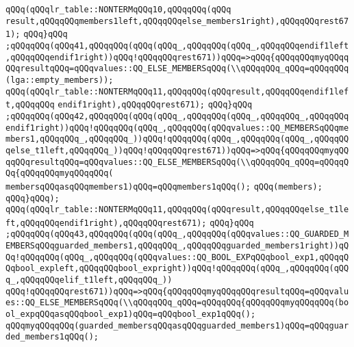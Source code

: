 \verb|qQQq(qQQqlr_table::NONTERMqQQq10,qQQqqQQq(qQQq|\newline
\verb|result,qQQqqQQqmembers1left,qQQqqQQqelse_members1right),qQQqqQQqrest671);|\newline
\verb|qQQq}qQQq|\newline
\verb|;qQQqqQQq(qQQq41,qQQqqQQq(qQQq(qQQq_,qQQqqQQq(qQQq_,qQQqqQQqendif1left,qQQqqQQqendif1right))qQQq!qQQqqQQqrest671))qQQq=>qQQq{qQQqqQQqmyqQQqqQQqresultqQQq=qQQqvalues::QQ_ELSE_MEMBERSqQQq(\\qQQqqQQq_qQQq=qQQqqQQq(lga::empty_members));|\newline
\verb|qQQq(qQQqlr_table::NONTERMqQQq11,qQQqqQQq(qQQqresult,qQQqqQQqendif1left,qQQqqQQq|\newline
\verb|endif1right),qQQqqQQqrest671);|\newline
\verb|qQQq}qQQq|\newline
\verb|;qQQqqQQq(qQQq42,qQQqqQQq(qQQq(qQQq_,qQQqqQQq(qQQq_,qQQqqQQq_,qQQqqQQqendif1right))qQQq!qQQqqQQq(qQQq_,qQQqqQQq(qQQqvalues::QQ_MEMBERSqQQqmembers1,qQQqqQQq_,qQQqqQQq_))qQQq!qQQqqQQq(qQQq_,qQQqqQQq(qQQq_,qQQqqQQqelse_t1left,qQQqqQQq_))qQQq!qQQqqQQqrest671))qQQq=>qQQq{qQQqqQQqmyqQQqqQQqresultqQQq=qQQqvalues::QQ_ELSE_MEMBERSqQQq(\\qQQqqQQq_qQQq=qQQqqQQq{qQQqqQQqmyqQQqqQQq(|\newline
\verb|membersqQQqasqQQqmembers1)qQQq=qQQqmembers1qQQq();|\newline
\verb|qQQq(members);|\newline
\verb|qQQq}qQQq);|\newline
\verb|qQQq(qQQqlr_table::NONTERMqQQq11,qQQqqQQq(qQQqresult,qQQqqQQqelse_t1left,qQQqqQQqendif1right),qQQqqQQqrest671);|\newline
\verb|qQQq}qQQq|\newline
\verb|;qQQqqQQq(qQQq43,qQQqqQQq(qQQq(qQQq_,qQQqqQQq(qQQqvalues::QQ_GUARDED_MEMBERSqQQqguarded_members1,qQQqqQQq_,qQQqqQQqguarded_members1right))qQQq!qQQqqQQq(qQQq_,qQQqqQQq(qQQqvalues::QQ_BOOL_EXPqQQqbool_exp1,qQQqqQQqbool_expleft,qQQqqQQqbool_expright))qQQq!qQQqqQQq(qQQq_,qQQqqQQq(qQQq_,qQQqqQQqelif_t1left,qQQqqQQq_))|\newline
\verb|qQQq!qQQqqQQqrest671))qQQq=>qQQq{qQQqqQQqmyqQQqqQQqresultqQQq=qQQqvalues::QQ_ELSE_MEMBERSqQQq(\\qQQqqQQq_qQQq=qQQqqQQq{qQQqqQQqmyqQQqqQQq(bool_expqQQqasqQQqbool_exp1)qQQq=qQQqbool_exp1qQQq();|\newline
\verb|qQQqmyqQQqqQQq(guarded_membersqQQqasqQQqguarded_members1)qQQq=qQQqguarded_members1qQQq();|\newline

